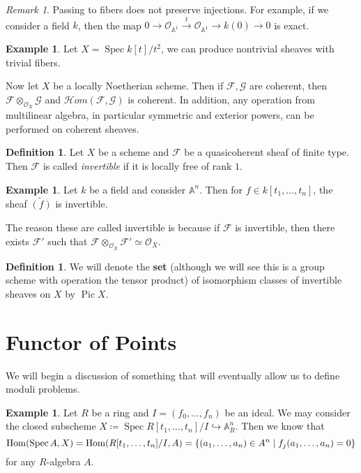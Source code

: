 \documentclass[leqno, openany]{memoir}
\theoremstyle{definition}
\newtheorem{defn}[thm]{Definition}
\newtheorem{exm}[thm]{Example}
\theoremstyle{remark}
\newtheorem{rmk}[thm]{Remark}
\theoremstyle{plain}
\theoremstyle{definition}
\theoremstyle{remark}
\newcommand{\A}{\mathbb{A}}
\newcommand{\mc}[1]{\mathcal{#1}}
\newcommand{\wt}[1]{\widetilde{#1}}
\DeclareMathOperator{\Hom}{Hom}
\DeclareMathOperator{\Spec}{Spec}
\DeclareMathOperator{\Pic}{Pic}
\begin{document}
\begin{rmk}
    Passing to fibers does not preserve injections. For example, if we consider a field $k$, then the map $0 \to \mc{O}_{\A^1} \xrightarrow{t} \mc{O}_{\A^1} \to k(0) \to 0$ is exact.
\end{rmk}

\begin{exm}
    Let $X = \Spec k[t] / t^2$, we can produce nontrivial sheaves with trivial fibers.
\end{exm}

Now let $X$ be a locally Noetherian scheme. Then if $\mc{F}, \mc{G}$ are coherent, then $\mc{F} \otimes_{\mc{O}_X} \mc{G}$ and $\mc{H}om(\mc{F}, \mc{G})$ is coherent. In addition, any operation from multilinear algebra, in particular symmetric and exterior powers, can be performed on coherent sheaves.

\begin{defn}
    Let $X$ be a scheme and $\mc{F}$ be a quasicoherent sheaf of finite type. Then $\mc{F}$ is called \textit{invertible} if it is locally free of rank $1$.
\end{defn}

\begin{exm}
    Let $k$ be a field and consider $\A^n$. Then for $f \in k[t_1, \ldots, t_n]$, the sheaf $\wt{(f)}$ is invertible.
\end{exm}

The reason these are called invertible is because if $\mc{F}$ is invertible, then there exists $\mc{F}'$ such that $\mc{F} \otimes_{\mc{O}_X} \mc{F}' \simeq \mc{O}_X$.

\begin{defn}
    We will denote the \textbf{set} (although we will see this is a group scheme with operation the tensor product) of isomorphism classes of invertible sheaves on $X$ by $\Pic X$.
\end{defn}

\section{Functor of Points}%
\label{sec:functor_of_points}

We will begin a discussion of something that will eventually allow us to define moduli problems.

\begin{exm}
    Let $R$ be a ring and $I = (f_0, \ldots, f_n)$ be an ideal. We may consider the closed subscheme $X \coloneqq \Spec R[t_1, \ldots, t_n]/I \hookrightarrow \A^n_R$. Then we know that
    \[ \Hom(\Spec A, X) = \Hom(R[t_1, \ldots, t_n]/I, A) = \qty{(a_1, \ldots, a_n) \in A^n \mid f_j(a_1, \ldots, a_n) = 0} \]
    for any $R$-algebra $A$.
\end{exm}
\end{document}
